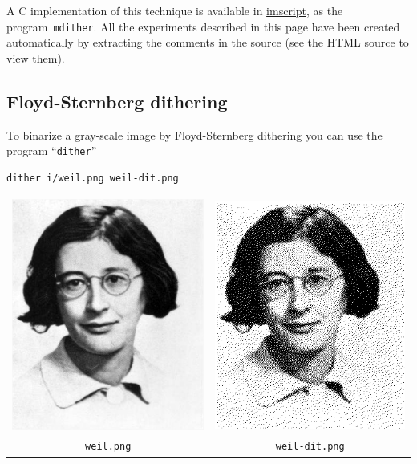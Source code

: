 A C implementation of this technique is available in
\href{https://github.com/mnhrdt/imscript/blob/master/src/mdither.c}{imscript},
as the program~\verb+mdither+.  All the experiments described in this page
have been created automatically by extracting the comments in the source (see
the HTML source to view them).


\subsection{Floyd-Sternberg dithering}

To binarize a gray-scale image by Floyd-Sternberg dithering you can use the
program ``\verb+dither+''

\begin{verbatim}
dither i/weil.png weil-dit.png
\end{verbatim}
\begin{tabular}{cc}
	\includegraphics{i/weil.png} &
	\includegraphics{weil-dit.png} \\
	\verb+weil.png+ &
	\verb+weil-dit.png+
\end{tabular}

